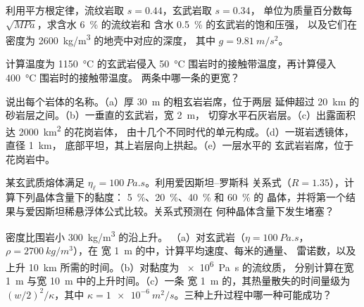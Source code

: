 \begin{exercise}[$\star$]\label{exo:b2:magma-emplacement:2}
利用平方根定律，流纹岩取 $s = 0.44$，玄武岩取 $s = 0.34$，
单位为质量百分数每 $\sqrt{\unit{MPa}}$，求含水 \qty{6}{\percent} 的流纹岩和
含水 \qty{0.5}{\percent} 的玄武岩的饱和压强，
以及它们在密度为 \qty{2600}{kg/m^3} 的地壳中对应的深度，
其中 $g = \qty{9.81}{m/s^2}$。
\end{exercise}

\begin{exercise}[$\star$]\label{exo:b2:magma-emplacement:3}
计算温度为 \qty{1150}{\celsius} 的玄武岩侵入
\qty{50}{\celsius} 围岩时的接触带温度，再计算侵入 \qty{400}{\celsius} 围岩时的接触带温度。
两条中哪一条的更宽？
\end{exercise}

\begin{exercise}[$\star$]\label{exo:b2:magma-emplacement:4}
说出每个岩体的名称。（a）厚 \qty{30}{m} 的粗玄岩岩席，位于两层
延伸超过 \qty{20}{km} 的砂岩层之间。（b）一垂直的玄武岩，宽 \qty{2}{m}，
切穿水平石灰岩层。（c）出露面积达 \qty{2000}{km^2} 的花岗岩体，
由十几个不同时代的单元构成。（d）一斑岩透镜体，直径 \qty{1}{km}，
底部平坦，其上岩层向上拱起。（e）一层水平的
玄武岩岩席，位于花岗岩中。
\end{exercise}

\begin{exercise}[$\star\star$]\label{exo:b2:magma-emplacement:5}
某玄武质熔体满足 $\eta_{\ell} = \qty{100}{Pa.s}$。利用爱因斯坦–罗斯科
关系式（$R = 1.35$），计算下列晶体含量下的黏度：
\qty{5}{\percent}、\qty{20}{\percent}、\qty{40}{\percent} 和 \qty{60}{\percent} 的
晶体，并将第一个结果与爱因斯坦稀悬浮体公式比较。关系式预测在
何种晶体含量下发生堵塞？
\end{exercise}

\begin{exercise}[$\star\star$]\label{exo:b2:magma-emplacement:6}
密度比围岩小 \qty{300}{kg/m^3} 的沿上升。
（a）对玄武岩（$\eta = \qty{100}{Pa.s}$，$\rho = \qty{2700}{kg/m^3}$），在
宽 \qty{1}{m} 的中，计算平均速度、每米的通量、
雷诺数，以及上升 \qty{10}{km} 所需的时间。（b）对黏度为 \qty{e6}{Pa.s} 的流纹质，
分别计算在宽 \qty{1}{m} 与宽 \qty{10}{m} 中的上升时间。（c）一条
宽 \qty{1}{m} 的，其热量散失的时间量级为 $(w/2)^2/\kappa$，其中 $\kappa =
\qty{1e-6}{m^2/s}$。三种上升过程中哪一种可能成功？
\end{exercise}

